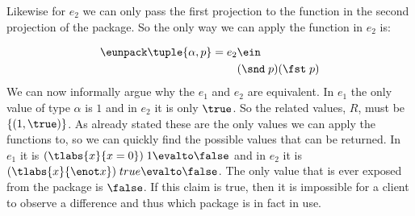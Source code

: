 Likewise for $e_2$ we can only pass the first projection to the function in the second projection of the package. So the only way we can apply the function in  $e_2$ is:

\begin{align*}
  \eunpack \tuple{\alpha,p} = e_2 & \ein \\
  & (\snd \; p)(\fst \; p)
\end{align*}
We can now informally argue why the $e_1$ and $e_2$ are equivalent. In $e_1$ the only value of type $\alpha$ is $1$ and in $e_2$ it is only $\true$. So the related values, $R$, must be $\{(1,\true)\}$. As  already stated these are the only values we can apply the functions to, so we can quickly find the possible values that can be returned. In $e_1$ it is $(\tlabs{x}{x=0})\; 1 \evalto \false$ and in $e_2$ it is $(\tlabs{x}{\enot x })\; true \evalto \false$. The only value that is ever exposed from the package is $\false$. If this claim is true, then it is impossible for a client to observe a difference and thus which package is in fact in use.

